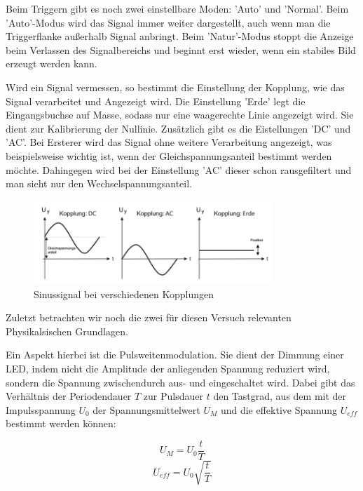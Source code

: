 \documentclass{article}
\begin{document}
Beim Triggern gibt es noch zwei einstellbare Moden: 'Auto' und 'Normal'. Beim 'Auto'-Modus wird das Signal immer weiter dargestellt, auch wenn man die Triggerflanke außerhalb Signal anbringt. Beim 'Natur'-Modus stoppt die Anzeige beim Verlassen des Signalbereichs und beginnt erst wieder, wenn ein stabiles Bild erzeugt werden kann.  

Wird ein Signal vermessen, so bestimmt die Einstellung der Kopplung, wie das Signal verarbeitet und Angezeigt wird. Die Einstellung 'Erde' legt die Eingangsbuchse auf Masse, sodass nur eine waagerechte Linie angezeigt wird. Sie dient zur Kalibrierung der Nullinie. Zusätzlich gibt es die Eistellungen 'DC' und 'AC'. Bei Ersterer wird das Signal ohne weitere Verarbeitung angezeigt, was beispielsweise wichtig ist, wenn der Gleichspannungsanteil bestimmt werden möchte. Dahingegen wird bei der Einstellung 'AC' dieser schon rausgefiltert und man sieht nur den Wechselspannungsanteil. 

\begin{figure} [!h]
    \centering
    \includegraphics[width=9cm]{graphics/kopp.png}
    \caption{Sinussignal bei verschiedenen Kopplungen}
    \label{fig:kopp}
\end{figure}

\newpage

Zuletzt betrachten wir noch die zwei für diesen Versuch relevanten Physikalsischen Grundlagen.

Ein Aspekt hierbei ist die Pulsweitenmodulation. Sie dient der Dimmung einer LED, indem nicht die Amplitude der anliegenden Spannung reduziert wird, sondern die Spannung zwischendurch aus- und eingeschaltet wird. Dabei gibt das Verhältnis der Periodendauer $T$ zur Pulsdauer $t$ den Tastgrad, aus dem mit der Impulsspannung $U_0$ der Spannungsmittelwert $U_M$ und die effektive Spannung $U_{eff}$ bestimmt werden können:

\begin{equation}
    U_M = U_0 \frac{t}{T}
    \label{eq:Ummmm}
\end{equation}
\begin{equation}
    U_{eff} = U_0 \sqrt{\frac{t}{T}}
    \label{eq:Ufffff}
\end{equation}
\end{document}

